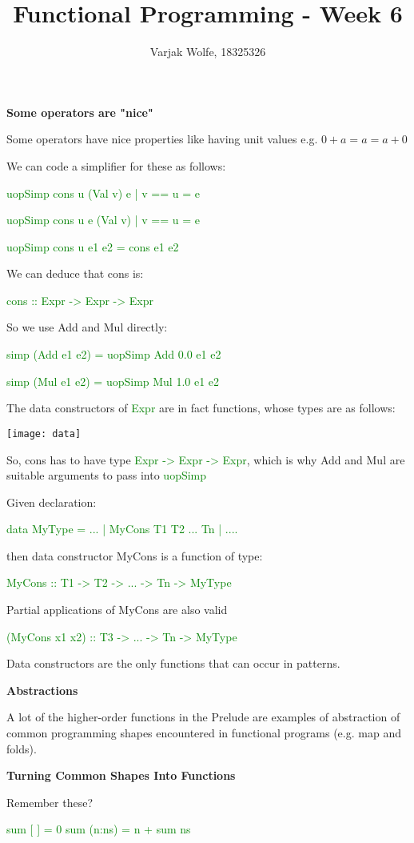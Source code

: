 \documentclass{article}
\title{Functional Programming - Week 6}
\author{Varjak Wolfe, 18325326}
\begin{document}
\textbf{Some operators are "nice"}

Some operators have nice properties like having unit values e.g. $0+a = a = a+0$

We can code a simplifier for these as follows:

\textcolor{green}{uopSimp cons u (Val v) e | v == u = e}

\textcolor{green}{uopSimp cons u e (Val v) | v == u = e}

\textcolor{green}{uopSimp cons u e1 e2 = cons e1 e2}

We can deduce that cons is:

\textcolor{green}{cons :: Expr -> Expr -> Expr}

So we use Add and Mul directly:

\textcolor{green}{simp (Add e1 e2) = uopSimp Add 0.0 e1 e2}

\textcolor{green}{simp (Mul e1 e2) = uopSimp Mul 1.0 e1 e2}


The data constructors of \textcolor{green}{Expr} are in fact functions, whose types are as follows:

\texttt{[image: data]}

So, cons has to have type \textcolor{green}{Expr -> Expr -> Expr}, which is why Add and Mul are suitable arguments to pass into \textcolor{green}{uopSimp}


Given declaration:

\textcolor{green}{data MyType = ... | MyCons T1 T2 ... Tn | ....}

then data constructor MyCons is a function of type:

\textcolor{green}{MyCons :: T1 -> T2 -> ... -> Tn -> MyType}

Partial applications of MyCons are also valid

\textcolor{green}{(MyCons x1 x2) :: T3 -> ... -> Tn -> MyType}

Data constructors are the only functions that can occur in patterns.


\textbf{Abstractions}

A lot of the higher-order functions in the Prelude are examples of abstraction of common programming shapes encountered in functional programs (e.g. map and folds).

\textbf{Turning Common Shapes Into Functions}

Remember these?

\textcolor{green}{sum [ ] = 0}
\textcolor{green}{sum (n:ns) = n + sum ns}
\end{document}
